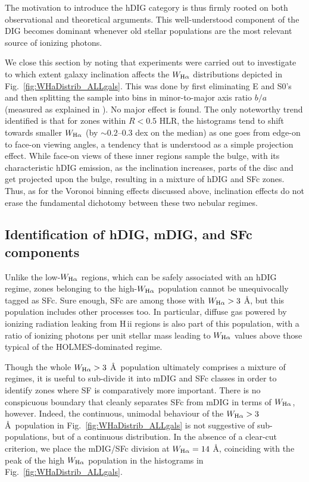\documentclass[a4paper, fleqn, usenatbib, useAMS]{mnras}
\newcommand{\Ha}{\ifmmode {\rm H}\alpha \else H$\alpha$\fi\xspace}
\newcommand{\hii}{H\,{\sc ii}\xspace}
\begin{document}
The motivation to introduce the hDIG category is thus firmly rooted on both observational and theoretical arguments. This well-understood component of the DIG becomes dominant whenever old stellar populations are the most relevant source of ionizing photons.

We close this section by noting that experiments were carried out to investigate to which extent galaxy inclination affects the $W_{\Ha}$ distributions depicted in Fig.\  \ref{fig:WHaDistrib_ALLgals}. This was done by first eliminating E and S0's and then splitting the sample into bins in minor-to-major axis ratio $b/a$ (measured as explained in \citealt{Andre.etal.2017}). No major effect is found. The only noteworthy trend identified is that for zones within $R < 0.5$ HLR, the histograms tend to shift towards smaller $W_{\Ha}$ (by $\sim 0.2$--0.3 dex on the median) as one goes from edge-on to face-on viewing angles, a tendency that is understood as a simple projection effect. While face-on views of these inner regions sample the bulge, with its characteristic hDIG emission, as the inclination increases, parts of the disc and get projected upon the bulge, resulting in a mixture of  hDIG and SFc zones. Thus, as for the Voronoi binning effects discussed above, inclination effects do  not erase the fundamental dichotomy between these two nebular regimes.


\subsection{Identification of hDIG, mDIG, and SFc components}
\label{sec:WHaLimits}

Unlike the low-$W_{\Ha}$ regions, which can be safely associated with an hDIG regime, zones belonging to the high-$W_{\Ha}$ population cannot be unequivocally tagged as SFc. Sure enough, SFc are among those with $W_{\Ha} > 3$ \AA, but this population includes other processes too. In particular, diffuse gas powered by ionizing radiation leaking from \hii regions is also part of this population, with a ratio of ionizing photons per unit stellar mass leading to $W_{\Ha}$ values above those typical of the HOLMES-dominated regime.

Though the whole $W_{\Ha} > 3$ \AA\ population ultimately comprises a mixture of regimes, it is useful to sub-divide it into mDIG and SFc classes in order to identify zones where SF is comparatively more important. There is no conspicuous boundary that cleanly separates SFc from mDIG in terms of $W_{\Ha}$, however. Indeed, the continuous, unimodal behaviour of the $W_{\Ha} > 3$ \AA\ population in Fig.\  \ref{fig:WHaDistrib_ALLgals} is not suggestive of sub-populations, but of a continuous distribution. In the absence of a clear-cut criterion, we place the mDIG/SFc division at $W_{\Ha} = 14$ \AA, coinciding with the peak of the high $W_{\Ha}$ population in the histograms in Fig.\  \ref{fig:WHaDistrib_ALLgals}.
\end{document}
